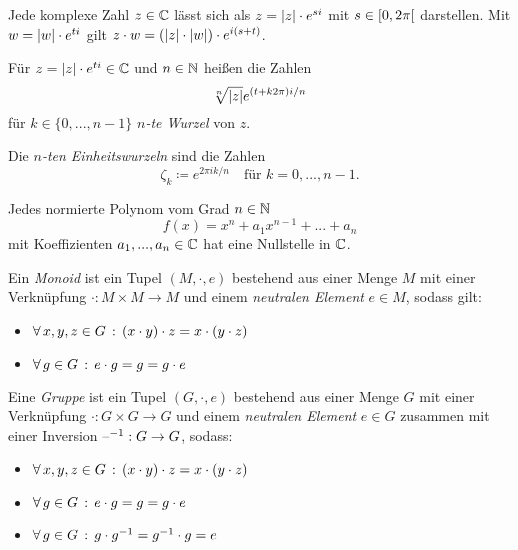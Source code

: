 \documentclass{cheat-sheet}
\begin{document}
\begin{bem}
  Jede komplexe Zahl $z \in \mathbb{C}$ lässt sich als $z = \lvert z\rvert \cdot e^{si}$ mit $s \in \left[ 0, 2\pi \right[$ darstellen.
  Mit $w = \lvert w\rvert \cdot e^{ti}$ gilt $z \cdot w = (\lvert z\rvert \cdot \lvert w\rvert) \cdot e^{i(s+t)}$.
\end{bem}

\begin{defn}
  Für $z = \lvert z\rvert \cdot e^{ti} \in \mathbb{C}$ und $n \in \mathbb{N}$ heißen die Zahlen
  \[ \sqrt[n]{\lvert z\rvert} e^{(t + k 2 \pi)i/n} \]
  für $k \in \{ 0, ..., n-1 \}$ \emph{$n$-te Wurzel} von $z$.
\end{defn}

\begin{defn}
  Die \emph{$n$-ten Einheitswurzeln} sind die Zahlen
  \[ \zeta_k \coloneqq e^{2 \pi ik/n} \quad \text{für $k = 0, ..., n-1$}. \]
\end{defn}


\begin{satz}
  Jedes normierte Polynom vom Grad $n \in \mathbb{N}$
  \[ f(x) = x^n + a_1 x^{n-1} + ... + a_n \]
  mit Koeffizienten $a_1, ..., a_n \in \mathbb{C}$ hat eine Nullstelle in $\mathbb{C}$.
\end{satz}


\begin{defn}
  Ein \emph{Monoid} ist ein Tupel $(M, \cdot, e)$ bestehend aus einer Menge $M$ mit einer Verknüpfung $\cdot : M \times M \to M$ und einem \emph{neutralen Element} $e \in M$, sodass gilt:
  \begin{itemize}
    \item $\forall \, {x, y, z \in G} \,:\, (x \cdot y) \cdot z = x \cdot (y \cdot z)$ 
    \item $\forall \, {g \in G} \,:\, e \cdot g = g = g \cdot e$ 
  \end{itemize}
\end{defn}

\begin{defn}
  Eine \emph{Gruppe} ist ein Tupel $(G, \cdot, e)$ bestehend aus einer Menge $G$ mit einer Verknüpfung $\cdot : G \times G \to G$ und einem \emph{neutralen Element} $e \in G$ zusammen mit einer Inversion $\text{--}^{-1} : G \to G$, sodass:
  \begin{itemize}
    \item $\forall \, {x, y, z \in G} \,:\, (x \cdot y) \cdot z = x \cdot (y \cdot z)$ 
    \item $\forall \, {g \in G} \,:\, e \cdot g = g = g \cdot e$ 
    \item $\forall \, {g \in G} \,:\, g \cdot g^{-1} = g^{-1} \cdot g = e$
  \end{itemize}
\end{defn}
\end{document}
